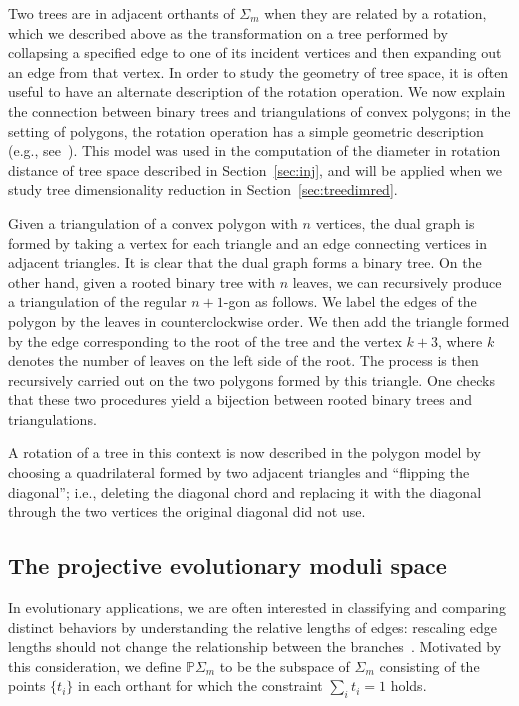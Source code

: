 \documentclass[a4paper,11pt]{article}
\begin{document}
Two trees are in adjacent orthants of $\Sigma_m$ when they are related by a rotation, which we described above as the transformation on a tree performed by collapsing a specified edge to one of its incident vertices and then expanding out an edge from that vertex.
In order to study the geometry of tree space, it is often useful to have an alternate description of the rotation operation.
We now explain the connection between binary trees and triangulations of convex polygons; in the setting of polygons, the rotation operation has a simple geometric description (e.g., see~\cite{sleator1988rotation}).
This model was used in the computation of the diameter in rotation distance of tree space described in Section~\ref{sec:inj}, and will be applied when we study tree dimensionality reduction in Section~\ref{sec:treedimred}.

Given a triangulation of a convex polygon with $n$ vertices, the dual graph is formed by taking a vertex for each triangle and an edge connecting vertices in adjacent triangles.
It is clear that the dual graph forms a binary tree.
On the other hand, given a rooted binary tree with $n$ leaves, we can recursively produce a triangulation of the regular $n+1$-gon as follows.
We label the edges of the polygon by the leaves in counterclockwise order.
We then add the triangle formed by the edge corresponding to the root of the tree and the vertex $k+3$, where $k$ denotes the number of leaves on the left side of the root.
The process is then recursively carried out on the two polygons formed by this triangle.
One checks that these two procedures yield a bijection between rooted binary trees and triangulations.

A rotation of a tree in this context is now described in the polygon model by choosing a quadrilateral formed by two adjacent triangles and ``flipping the diagonal''; i.e., deleting the diagonal chord and replacing it with the diagonal through the two vertices the original diagonal did not use.

\subsection{The projective evolutionary moduli space}

In evolutionary applications, we are often interested in classifying and comparing distinct behaviors by understanding the relative lengths of edges: rescaling edge lengths should not change the relationship between the branches~\cite{zairis2014moduli}.
Motivated by this consideration, we define $\mathbb{P} \Sigma_m$ to be the subspace of $\Sigma_m$ consisting of the points $\{t_i\}$ in each orthant for which the constraint $\sum_{i} t_i = 1$ holds.
\end{document}
